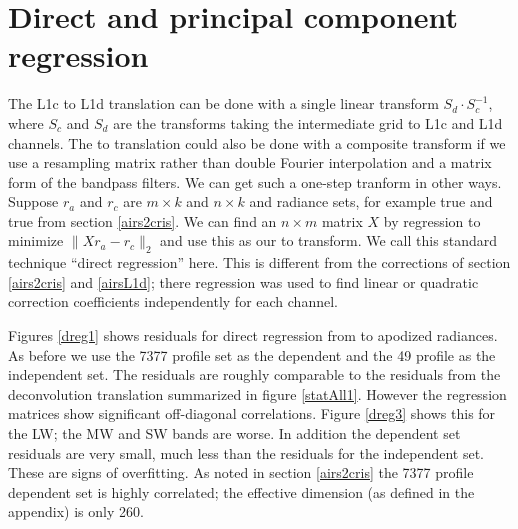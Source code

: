 \documentclass[10pt,twocolumn]{article}
\begin{document}
\section{Direct and principal component regression}
\label{dregr}

The {\airs} L1c to L1d translation can be done with a single 
linear transform $S_d\cdot S_c^{-1}$, where $S_c$ and $S_d$ are the
transforms taking the intermediate grid to L1c and L1d channels.
The {\airs} to {\cris} translation could also be done with a
composite transform if we use a resampling matrix rather than
double Fourier interpolation and a matrix form of the bandpass
filters.  We can get such a one-step tranform in other ways.
Suppose $r_a$ and $r_c$ are $m \times k$ and $n \times k$ {\airs}
and {\cris} radiance sets, for example true {\airs} and true {\cris}
from section \ref{airs2cris}.  We can find an $n \times m$ matrix
$X$ by regression to minimize $\|X r_a - r_c\|_2$ and use this as
our {\airs} to {\cris} transform.  We call this standard technique
``direct regression'' here.  This is different from the corrections
of section \ref{airs2cris} and \ref{airsL1d}; there regression was
used to find linear or quadratic correction coefficients
independently for each channel.


Figures \ref{dreg1} shows residuals for direct regression from
{\airs} to apodized {\cris} radiances.  As before we use the 7377
profile set as the dependent and the 49 profile as the independent
set.  The residuals are roughly comparable to the residuals from
the deconvolution translation summarized in figure \ref{statAll1}.
However the regression matrices show significant off-diagonal
correlations.  Figure \ref{dreg3} shows this for the LW; the MW and
SW bands are worse.  In addition the dependent set residuals are
very small, much less than the residuals for the independent set.
These are signs of overfitting.  As noted in section \ref{airs2cris}
the 7377 profile dependent set is highly correlated; the effective
dimension (as defined in the appendix) is only 260.

\end{document}
